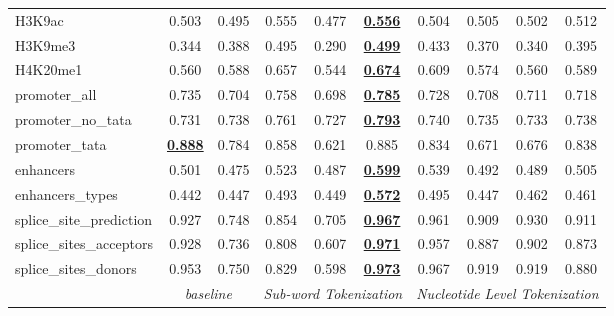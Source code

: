 \begin{table*}[h!]
\begin{center}
\begin{tabular}{l|cc|ccc|cccc}
H3K9ac & 0.503 & 0.495 & 0.555 & 0.477 & {\ul \textbf{0.556}} & 0.504 & 0.505 & 0.502 & 0.512 \\
H3K9me3 & 0.344 & 0.388 & 0.495 & 0.290 & {\ul \textbf{0.499}} & 0.433 & 0.370 & 0.340 & 0.395 \\
H4K20me1 & 0.560 & 0.588 & 0.657 & 0.544 & {\ul \textbf{0.674}} & 0.609 & 0.574 & 0.560 & 0.589 \\
promoter\_all & 0.735 & 0.704 & 0.758 & 0.698 & {\ul \textbf{0.785}} & 0.728 & 0.708 & 0.711 & 0.718 \\
promoter\_no\_tata & 0.731 & 0.738 & 0.761 & 0.727 & {\ul \textbf{0.793}} & 0.740 & 0.735 & 0.733 & 0.738 \\
promoter\_tata & {\ul \textbf{0.888}} & 0.784 & 0.858 & 0.621 & 0.885 & 0.834 & 0.671 & 0.676 & 0.838 \\
enhancers & 0.501 & 0.475 & 0.523 & 0.487 & {\ul \textbf{0.599}} & 0.539 & 0.492 & 0.489 & 0.505 \\
enhancers\_types & 0.442 & 0.447 & 0.493 & 0.449 & {\ul \textbf{0.572}} & 0.495 & 0.447 & 0.462 & 0.461 \\
splice\_site\_prediction & 0.927 & 0.748 & 0.854 & 0.705 & {\ul \textbf{0.967}} & 0.961 & 0.909 & 0.930 & 0.911 \\
splice\_sites\_acceptors & 0.928 & 0.736 & 0.808 & 0.607 & {\ul \textbf{0.971}} & 0.957 & 0.887 & 0.902 & 0.873 \\
splice\_sites\_donors & 0.953 & 0.750 & 0.829 & 0.598 & {\ul \textbf{0.973}} & 0.967 & 0.919 & 0.919 & 0.880 \\
\hline
\multicolumn{1}{l|}{} & \multicolumn{2}{c|}{\textit{baseline}} & \multicolumn{3}{c|}{\textit{Sub-word Tokenization}} & \multicolumn{4}{c}{\textit{Nucleotide Level Tokenization}} \\ \hline
\end{tabular}
\end{center}
\end{table*}